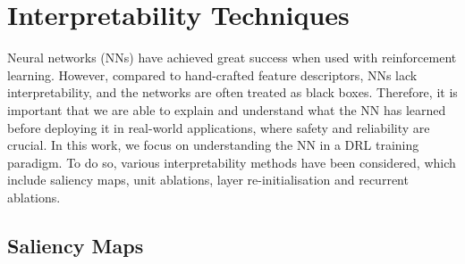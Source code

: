 \section{Interpretability Techniques}
Neural networks (NNs) have achieved great success when used with reinforcement learning. However, compared to hand-crafted feature descriptors, NNs lack interpretability, and the networks are often treated as black boxes. Therefore, it is important that we are able to explain and understand what the NN has learned before deploying it in real-world applications, where safety and reliability are crucial. In this work, we focus on understanding the NN in a DRL training paradigm. To do so, various interpretability methods have been considered, which include saliency maps, unit ablations, layer re-initialisation and recurrent ablations. 
\label{ch6:sec_interp}
\subsection{Saliency Maps}
